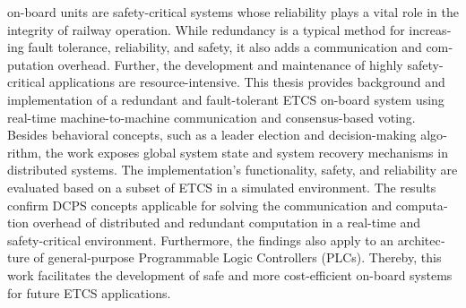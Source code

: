 
\null\vfil
\begin{otherlanguage}{english}
\begin{center}\textsf{\textbf{\abstractname}}\end{center}
%
\noindent {} on-board units are safety-critical systems whose reliability plays a vital role in the integrity of railway operation.
While redundancy is a typical method for increasing fault tolerance, reliability, and safety, it also adds a communication and computation overhead.
Further, the development and maintenance of highly safety-critical applications are resource-intensive.
This thesis provides background and implementation of a redundant and fault-tolerant ETCS on-board system using real-time  machine-to-machine communication and consensus-based voting.
Besides behavioral concepts, such as a leader election and decision-making algorithm, the work exposes global system state and system recovery mechanisms in distributed systems.
The implementation's functionality, safety, and reliability are evaluated based on a subset of ETCS in a simulated environment.
The results confirm DCPS concepts applicable for solving the communication and computation overhead of distributed and redundant computation in a real-time and safety-critical environment.
Furthermore, the findings also apply to an architecture of general-purpose Programmable Logic Controllers (PLCs).
Thereby, this work facilitates the development of safe and more cost-efficient on-board systems for future ETCS applications.

\end{otherlanguage}
\vfil\null

\iffalse


\null\vfil
\begin{otherlanguage}{ngerman}
\begin{center}\textsf{\textbf{\abstractname}}\end{center}

\noindent Lorem ipsum dolor sit amet, consetetur sadipscing elitr, sed diam nonumy eirmod tempor invidunt ut labore et dolore magna aliquyam erat, sed diam voluptua. At vero eos et accusam et justo duo dolores et ea rebum. Stet clita kasd gubergren, no sea takimata sanctus est Lorem ipsum dolor sit amet. Lorem ipsum dolor sit amet, consetetur sadipscing elitr, sed diam nonumy eirmod tempor invidunt ut labore et dolore magna aliquyam erat, sed diam voluptua. At vero eos et accusam et justo duo dolores et ea rebum. Stet clita kasd gubergren, no sea takimata sanctus est Lorem ipsum dolor sit amet.

\end{otherlanguage}
\vfil\null

\fi


